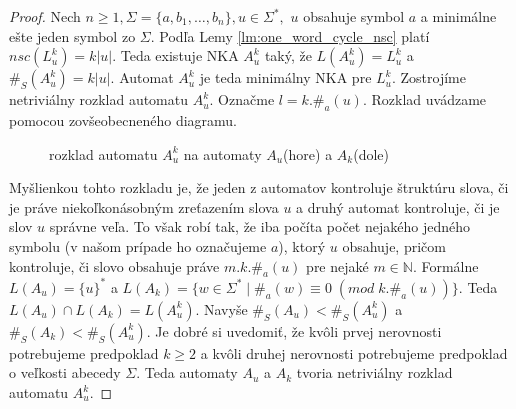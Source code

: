 \begin{proof}
Nech $ n \geq 1, \Sigma = \lbrace a, b_1, \ldots , b_n \rbrace, u \in \Sigma^*,$ $ u $ obsahuje symbol $ a $ a minimálne ešte jeden symbol zo $ \Sigma $. Podľa Lemy \ref{lm:one_word_cycle_nsc} platí $ nsc(L_u^k) = k|u| $. Teda existuje NKA $ A_u^k $ taký, že $ L(A_u^k) = L_u^k $ a $ \#_S(A_u^k) = k|u| $. Automat $ A_u^k $ je teda minimálny NKA pre $ L_u^k $. Zostrojíme netriviálny rozklad automatu $ A_u^k $. Označme $ l = k.\#_a(u) $. Rozklad uvádzame pomocou zovšeobecneného diagramu.

\begin{figure}[H]
\centering
{}


\caption{rozklad automatu $ A_u^k $ na automaty $ A_u $(hore) a $ A_k $(dole)}
\end{figure}

Myšlienkou tohto rozkladu je, že jeden z automatov kontroluje štruktúru slova, či je práve niekoľkonásobným zreťazením slova $ u $ a druhý automat kontroluje, či je slov $ u $ správne veľa. To však robí tak, že iba počíta počet nejakého jedného symbolu (v našom prípade ho označujeme $ a $), ktorý $ u $ obsahuje, pričom kontroluje, či slovo obsahuje práve $ m.k.\#_a(u) $ pre nejaké $ m \in \mathbb{N} $. Formálne $ L(A_u) = \lbrace u \rbrace^* $ a $ L(A_k) = \lbrace w \in \Sigma^* \; | \; \#_a(w) \equiv 0 \; (mod \; k.\#_a(u)) \rbrace $. Teda $ L(A_u) \cap L(A_k) = L(A_u^k) $. Navyše $ \#_S(A_u) < \#_S(A_u^k) $ a $ \#_S(A_k) < \#_S(A_u^k) $. Je dobré si uvedomiť, že kvôli prvej nerovnosti potrebujeme predpoklad $ k \geq 2 $ a kvôli druhej nerovnosti potrebujeme predpoklad o veľkosti abecedy $ \Sigma $. Teda automaty $ A_u $ a $ A_k $ tvoria netriviálny rozklad automatu $ A_u^k $.


\end{proof}
